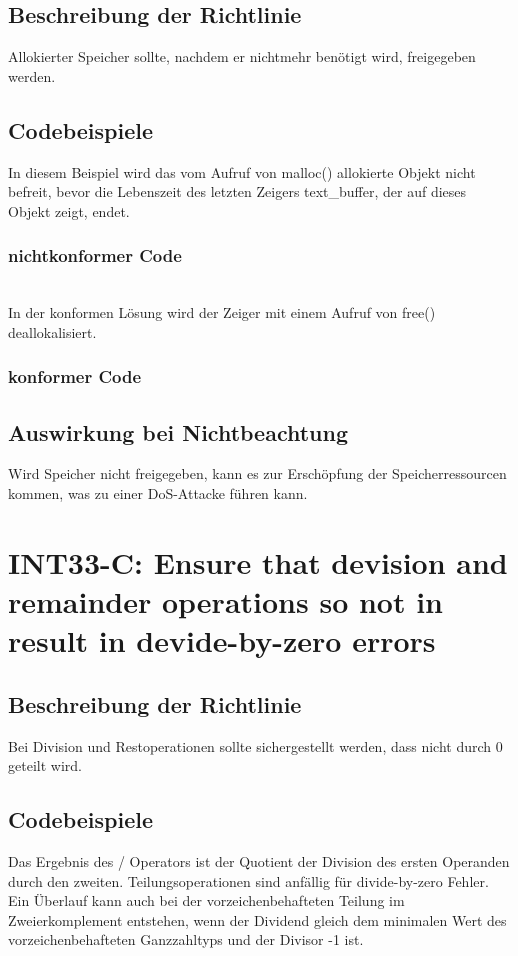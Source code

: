 \documentclass[12pt]{article}
\begin{document}
\subsection{Beschreibung der Richtlinie}
Allokierter Speicher sollte, nachdem er nichtmehr ben\"otigt wird, freigegeben werden.
\subsection{Codebeispiele}
In diesem Beispiel wird das vom Aufruf von malloc() allokierte Objekt nicht befreit, bevor die Lebenszeit des letzten Zeigers text\_buffer, der auf dieses Objekt zeigt, endet.

\subsubsection{nichtkonformer Code}

~\\
In der konformen L\"osung wird der Zeiger mit einem Aufruf von free() de\-allokalisiert.
\subsubsection{konformer Code}


\subsection{Auswirkung bei Nichtbeachtung}
Wird Speicher nicht freigegeben, kann es zur Ersch\"opfung der Speicherressourcen kommen, was zu einer DoS-Attacke f\"uhren kann.


\newpage
\section{INT33-C: Ensure that devision and remainder operations so not in result in devide-by-zero errors}
\subsection{Beschreibung der Richtlinie}
Bei Division und Restoperationen sollte sichergestellt werden, dass nicht durch 0 geteilt wird.
\subsection{Codebeispiele}
Das Ergebnis des / Operators ist der Quotient der Division des ersten Operanden durch den zweiten. Teilungsoperationen sind anf\"allig f\"ur divide-by-zero Fehler.\\
Ein \"Uberlauf kann auch bei der vorzeichenbehafteten Teilung im Zweierkomplement entstehen, wenn der Dividend gleich dem minimalen Wert des vorzeichenbehafteten Ganzzahltyps und der Divisor -1 ist.
\end{document}
